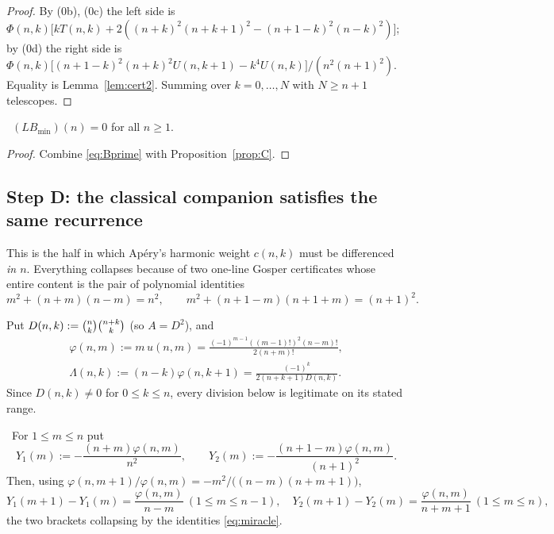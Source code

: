 \begin{proof}
By (0b), (0c) the left side is $\Phi(n,k)\bigl[kT(n,k)
+2((n+k)^2(n+k+1)^2-(n+1-k)^2(n-k)^2)\bigr]$; by (0d) the right side is
$\Phi(n,k)\bigl[(n+1-k)^2(n+k)^2U(n,k+1)-k^4U(n,k)\bigr]/(n^2(n+1)^2)$. Equality is
Lemma~\ref{lem:cert2}. Summing over $k=0,\dots,N$ with $N\ge n+1$ telescopes.
\end{proof}

\begin{theorem}\label{thm:LBmin}
\Proved\ $(LB_{\min})(n)=0$ for all $n\ge1$.
\end{theorem}

\begin{proof}
Combine \eqref{eq:Bprime} with Proposition~\ref{prop:C}.
\end{proof}

\subsection{Step D: the classical companion satisfies the same recurrence}

This is the half in which Ap\'ery's harmonic weight $c(n,k)$ must be differenced
\emph{in $n$}. Everything collapses because of two one-line Gosper certificates whose
entire content is the pair of polynomial identities
\begin{equation}\label{eq:miracle}
   m^2+(n+m)(n-m)=n^2,
   \qquad
   m^2+(n+1-m)(n+1+m)=(n+1)^2 .
\end{equation}

Put $D(n,k):=\binom{n}{k}\binom{n+k}{k}$ (so $A=D^2$), and
\[
 \begin{gathered}
   \varphi(n,m):=m\,u(n,m)=\frac{(-1)^{m-1}((m-1)!)^2(n-m)!}{2(n+m)!},\\
   \Lambda(n,k):=(n-k)\varphi(n,k+1)=\frac{(-1)^k}{2(n+k+1)D(n,k)} .
 \end{gathered}
\]
Since $D(n,k)\ne0$ for $0\le k\le n$, every division below is legitimate on its stated
range.

\begin{lemma}\label{lem:D1}
\Proved\ For $1\le m\le n$ put
\[
   Y_1(m):=-\frac{(n+m)\varphi(n,m)}{n^2},
   \qquad
   Y_2(m):=-\frac{(n+1-m)\varphi(n,m)}{(n+1)^2} .
\]
Then, using $\varphi(n,m+1)/\varphi(n,m)=-m^2/\bigl((n-m)(n+m+1)\bigr)$,
\[
   Y_1(m+1)-Y_1(m)=\frac{\varphi(n,m)}{n-m}\ (1\le m\le n-1),
   \quad
   Y_2(m+1)-Y_2(m)=\frac{\varphi(n,m)}{n+m+1}\ (1\le m\le n),
\]
the two brackets collapsing by the identities \eqref{eq:miracle}.
\end{lemma}

